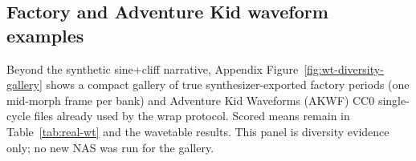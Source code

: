\subsection{Factory and Adventure Kid waveform examples}
\label{sec:wt-gallery}

Beyond the synthetic sine{+}cliff narrative, Appendix Figure~\ref{fig:wt-diversity-gallery} shows a compact gallery of true synthesizer-exported factory periods (one mid-morph frame per bank) and Adventure Kid Waveforms (AKWF) CC0 single-cycle files already used by the wrap protocol.
Scored means remain in Table~\ref{tab:real-wt} and the wavetable results.
This panel is diversity evidence only; no new NAS was run for the gallery.
